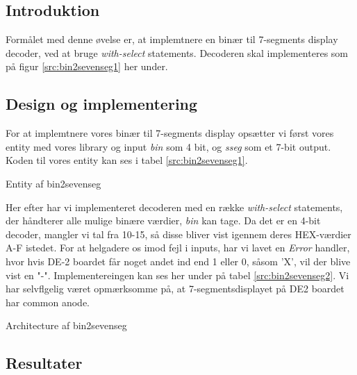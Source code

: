 \documentclass[../journal2.tex]{subfiles}
\begin{document}
\subsection{Introduktion}

Formålet med denne øvelse er, at implemtnere en binær til 7-segments display decoder, ved at bruge \textit{with-select} statements. Decoderen skal implementeres som på figur \ref{src:bin2sevenseg1} her under.


\subsection{Design og implementering}

For at implemtnere vores binær til 7-segments display opsætter vi først vores entity med vores library og input \textit{bin} som 4 bit, og \textit{sseg} som et 7-bit output. Koden til vores entity kan ses i tabel \ref{src:bin2sevenseg1}.

\begin{table}[!hbt]
  \centering
    \framebox{
      \rule{8pt}{0pt}
        
}
\caption{Entity af bin2sevenseg}
\label{src:bin2sevenseg1}
\end{table}

Her efter har vi implementeret decoderen med en række \textit{with-select} statements, der håndterer alle mulige binære værdier, \textit{bin} kan tage. Da det er en 4-bit decoder, mangler vi tal fra 10-15, så disse bliver vist igennem deres HEX-værdier A-F istedet. For at helgadere os imod fejl i inputs, har vi lavet en \textit{Error} handler, hvor hvis DE-2 boardet får noget andet ind end 1 eller 0, såsom 'X', vil der blive vist en "-". Implementereingen kan ses her under på tabel \ref{src:bin2sevenseg2}. Vi har selvflgelig været opmærksomme på, at 7-segmentsdisplayet på DE2 boardet har common anode.

\begin{table}[H]
    \centering
      \framebox{
        \rule{8pt}{0pt}
          
  }
  \caption{Architecture af bin2sevenseg}
  \label{src:bin2sevenseg2}
\end{table}

\subsection{Resultater}
\end{document}
